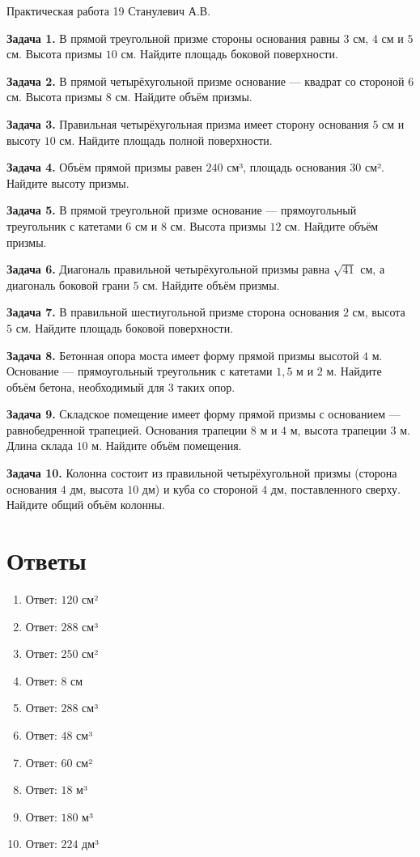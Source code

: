 \documentclass{umk-matematika}
\begin{document}
\maketitlepage
    {Практическая работа 19}
    {}
    {Станулевич А.В.}

\textbf{Задача 1.} В прямой треугольной призме стороны основания равны $3$ см, $4$ см и $5$ см. Высота призмы $10$ см. Найдите площадь боковой поверхности.\par\vspace{10pt}
\textbf{Задача 2.} В прямой четырёхугольной призме основание — квадрат со стороной $6$ см. Высота призмы $8$ см. Найдите объём призмы.\par\vspace{10pt}
\textbf{Задача 3.} Правильная четырёхугольная призма имеет сторону основания $5$ см и высоту $10$ см. Найдите площадь полной поверхности.\par\vspace{10pt}
\textbf{Задача 4.} Объём прямой призмы равен $240$ см³, площадь основания $30$ см². Найдите высоту призмы.\par\vspace{10pt}
\textbf{Задача 5.} В прямой треугольной призме основание — прямоугольный треугольник с катетами $6$ см и $8$ см. Высота призмы $12$ см. Найдите объём призмы.\par\vspace{10pt}
\textbf{Задача 6.} Диагональ правильной четырёхугольной призмы равна $\sqrt{41}$ см, а диагональ боковой грани $5$ см. Найдите объём призмы.\par\vspace{10pt}
\textbf{Задача 7.} В правильной шестиугольной призме сторона основания $2$ см, высота $5$ см. Найдите площадь боковой поверхности.\par\vspace{10pt}
\textbf{Задача 8.} Бетонная опора моста имеет форму прямой призмы высотой $4$ м. Основание — прямоугольный треугольник с катетами $1{,}5$ м и $2$ м. Найдите объём бетона, необходимый для $3$ таких опор.\par\vspace{10pt}
\textbf{Задача 9.} Складское помещение имеет форму прямой призмы с основанием — равнобедренной трапецией. Основания трапеции $8$ м и $4$ м, высота трапеции $3$ м. Длина склада $10$ м. Найдите объём помещения.\par\vspace{10pt}
\textbf{Задача 10.} Колонна состоит из правильной четырёхугольной призмы (сторона основания $4$ дм, высота $10$ дм) и куба со стороной $4$ дм, поставленного сверху. Найдите общий объём колонны.\par\vspace{10pt}
\newpage
\section*{Ответы}

\begin{enumerate}
  \item Ответ: $120$ см²
  \item Ответ: $288$ см³
  \item Ответ: $250$ см²
  \item Ответ: $8$ см
  \item Ответ: $288$ см³
  \item Ответ: $48$ см³
  \item Ответ: $60$ см²
  \item Ответ: $18$ м³
  \item Ответ: $180$ м³
  \item Ответ: $224$ дм³
\end{enumerate}
\end{document}
